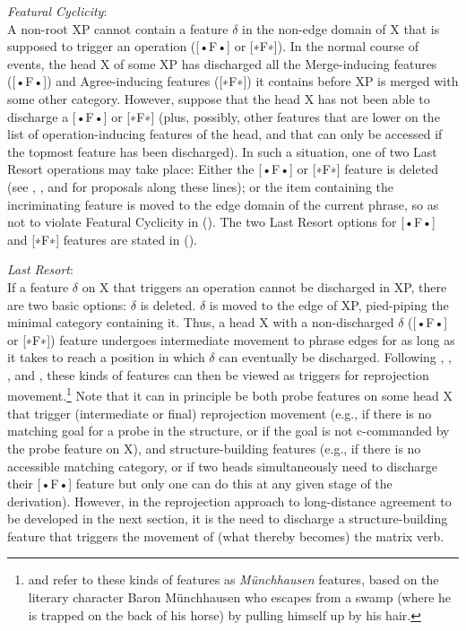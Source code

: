 \documentclass[output=paper
,modfonts
,nonflat]{langsci/langscibook}
\begin{document}
	\ea\label{ex:mueller:27} {\itshape Featural Cyclicity}:\\\label{fc}
	A non-root XP cannot contain a feature $\delta$ in the non-edge domain of X that is supposed to trigger an operation ([•F•] or [∗F∗]).\z
	In the normal course of events, the head X of some XP has discharged
	all the Merge-inducing features ([•F•])
	and Agree-inducing features ([∗F∗]) it contains before XP is merged with some
	other category. However, suppose that the head X has not been able to
	discharge a [•F•] or [∗F∗]
	(plus, possibly, other features that are lower on the list of
	operation-inducing features of the head, and that can only be accessed
	if the topmost feature has been discharged). In such a situation, one
	of two Last Resort operations may take place: Either the [•F•] or [∗F∗] feature is deleted (see 
	\citealt{BejarRezac:09}, \citealt{Preminger:14}, and  \citealt{Georgi:14} for proposals along these
	lines); or the item containing the incriminating feature is moved to the edge domain of
	the current phrase, so as not to violate Featural Cyclicity
	in (\Last). The two Last Resort options for [•F•] and [∗F∗] features are stated
	in (\Next). 

	\ea\label{ex:mueller:28} {\itshape Last Resort}:\\
	If a feature $\delta$ on X that triggers an operation cannot be discharged
	in XP, there are two basic options:
	\ea $\delta$ is deleted.
	\ex $\delta$ is moved to the edge of XP, pied-piping the minimal
	category containing it. 
	\z
	\z
	Thus, a head X with a non-discharged $\delta$ ([•F•] or [∗F∗]) feature undergoes
	intermediate movement to phrase edges for as long as it takes to reach
	a position in which $\delta$ can eventually be discharged. Following
	\citet{Fanselow:03,Fanselow:09:boo}, \citet{Suranyi:05},
	\citet{Matushansky:06}, and \citet{GeorgiMueller:10:rep}, these kinds
	of features can then be viewed as triggers for reprojection
	movement.\footnote{\citet{Fanselow:03,Fanselow:09:boo} and
		\citet{GeorgiMueller:10:rep} refer to these kinds of features as
		{\itshape M\"unchhausen} features, based on the literary character
		Baron M\"unchhausen who escapes from a swamp (where he is
		trapped on the back of his horse) by pulling himself up by his
		hair.} Note that it can in principle be both probe features on
	some head X that trigger (intermediate or final) reprojection movement
	(e.g., if there is no matching goal for a probe in the structure, or
	if the goal is not c-commanded by the probe feature on X), and
	structure-building features (e.g., if there is no accessible matching
	category, or if two heads simultaneously need to discharge their
	[•F•] feature but only one can do
	this at any given stage of the derivation). However, in the
	reprojection approach to long-distance agreement to be developed in
	the next section, it is the need to discharge a structure-building
	feature that triggers the movement of (what thereby becomes) the
	matrix verb.
	
\end{document}
